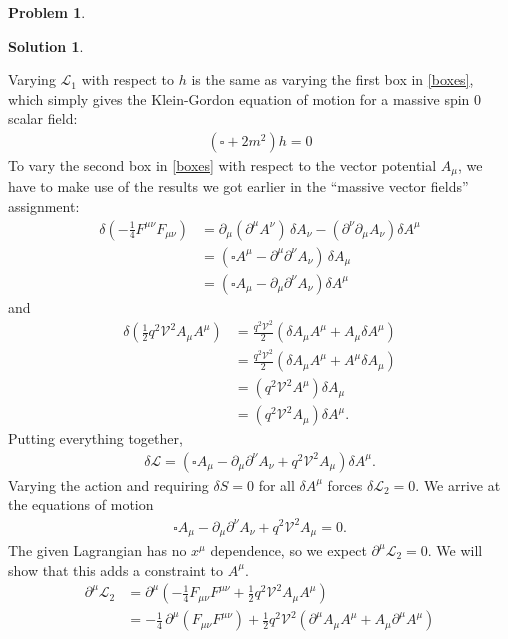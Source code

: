 \documentclass[a4paper,11pt]{article}
\numberwithin{equation}{section}
\theoremstyle{definition}
\newtheorem{prob}{Problem}[section]
\newtheorem{sln}{Solution}[section]
\newcommand{\p}{\partial}
\newcommand{\lag}{\mathcal{L}}
\newcommand{\V}{\mathcal{V}}
\begin{document}
\begin{prob}
\begin{sln}
\begin{enumerate}
				Varying $\lag_1$ with respect to $h$ is the same as varying the first box in \eqref{boxes}, which simply gives the Klein-Gordon equation of motion for a massive spin 0 scalar field:
				\begin{align}
				\boxed{(\square + 2m^2)h = 0}
				\end{align}
				To vary the second box in \eqref{boxes} with respect to the vector potential $A_\mu$, we have to make use of the results we got earlier in the ``massive vector fields'' assignment:
				\begin{align}
				\delta\left(-\frac{1}{4}F^{\mu\nu}F_{\mu\nu} \right) &= \partial_\mu(\partial^\mu A^\nu)\,\delta A_\nu - (\partial^\nu\partial_\mu A_\nu)\delta A^\mu\nonumber\\ 
				&= \left(\square A^\mu - \p^\mu\p^\nu A_\nu \right)\,\delta A_\mu\nonumber\\
				&= \left(\square A_\mu - \p_\mu \p^\nu A_\nu \right)\delta A^\mu
				\end{align}
				and
				\begin{align}
				\delta \left(\frac{1}{2}q^2\V^2 A_\mu A^\mu  \right) &= \frac{q^2\V^2}{2} \left( \delta A_\mu A^\mu + A_\mu \delta A^\mu \right)\nonumber\\
				&=  \frac{q^2\V^2}{2} \left( \delta A_\mu A^\mu + A^\mu \delta A_\mu \right)\\
				&= \left(q^2\V^2 A^\mu\right)\delta A_\mu \nonumber\\
				&= \left(q^2\V^2 A_\mu\right)\delta A^\mu.
				\end{align}
				Putting everything together, 
				\begin{align}
				\delta \lag = \left(\square A_\mu - \p_\mu \p^\nu A_\nu + q^2\V^2 A_\mu \right)\delta A^\mu.
				\end{align}
				Varying the action and requiring $\delta S = 0$ for all $\delta A^\mu$ forces $\delta \lag_2 =0$. We arrive at the equations of motion
				\begin{align}
				\square A_\mu - \p_\mu \p^\nu A_\nu +  q^2\V^2 A_\mu = 0.
				\end{align}
				The given Lagrangian has no $x^\mu$ dependence, so we expect $\p^\mu \lag_2 = 0$. We will show that this adds a constraint to $A^\mu$.
				\begin{align}
				\p^\mu\lag_2 &= \p^\mu\left( -\frac{1}{4}F_{\mu\nu}F^{\mu\nu} + \frac{1}{2}q^2\V^2 A_\mu A^\mu \right)\nonumber\\
				&= -\frac{1}{4}\,\p^\mu\left( F_{\mu\nu}F^{\mu\nu}\right) + \frac{1}{2}q^2\V^2\left(\p^\mu A_\mu A^\mu + A_\mu \p^\mu A^\mu \right)\nonumber\\

\end{align}
\end{enumerate}
\end{sln}
\end{prob}
\end{document}
